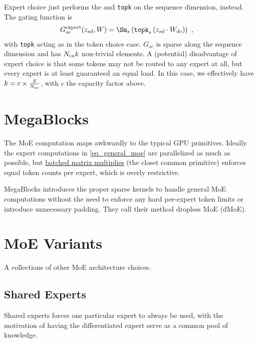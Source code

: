 Expert choice just performs the \Sm and \texttt{topk} on the sequence dimension,
instead.  The gating function is
\begin{align}
    G  ^{ {\rm  expert} }_{ se }(z _{ sd }, W)  &= \Sm_{ s } \left ( \texttt{topk} _{ s } \left ( z _{ sd } \cdot W _{ de }  \right ) \right ) \ , \label{eq_expert_choice}
\end{align}
with \texttt{topk} acting as in the token choice case. $G _{ se } $ is sparse along the sequence
dimension and has $ N _{ {\rm ex} }k $ non-trivial elements. A (potential) disadvantage of expert
choice is that some tokens may not be routed to any expert at all, but every expert is at least
guaranteed an equal load. In this case, we effectively have $ k = c \times  \frac{ S }{ N _{ {\rm
ex} } } $, with $ c $ the capacity factor above.


\section{MegaBlocks}

The MoE computation maps awkwardly to the typical GPU primitives. Ideally the expert computations in
\eqref{eq_general_moe} are parallelized as much as possible, but
\href{https://pytorch.org/docs/stable/generated/torch.bmm.html}{batched matrix multiplies} (the
closet common primitive) enforces equal token counts per expert, which is overly restrictive.

MegaBlocks \cite{gale2022megablocksefficientsparsetraining} introduces the proper sparse kernels to
handle general MoE computations without the need to enforce any hard per-expert token limits or
introduce unnecessary padding. They call their method dropless MoE (dMoE).


\section{MoE Variants}

A collections of other MoE architecture choices.

\subsection{Shared Experts}


Shared experts forces one particular expert to always be used, with the motivation of having the
differentiated expert serve as a common pool of knowledge.

